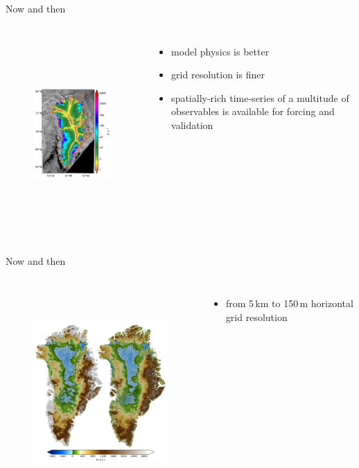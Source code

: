 \documentclass[hide notes,intlimits,unknownkeysallowed]{beamer}
\begin{document}
\begin{frame}{Now and then}
  \begin{columns}
    \column[c]{6cm}
    \begin{figure}
      \includegraphics[height=7.5cm]{today}
    \end{figure}
    \column[c]{6cm}
    \begin{itemize}
      \item model physics is better
      \item grid resolution is finer
      \item spatially-rich time-series of a multitude of observables is available for forcing and validation
    \end{itemize}
  \end{columns}
\end{frame}

\begin{frame}{Now and then}
  \begin{columns}
    \column[c]{8cm}
    \begin{figure}
      \includegraphics[height=8cm]{greenland_bed}
    \end{figure}
    \column[c]{4cm}
    \begin{itemize}
    \item from 5\,km to 150\,m horizontal grid resolution
    \end{itemize}
  \end{columns}
\end{frame}
\end{document}
